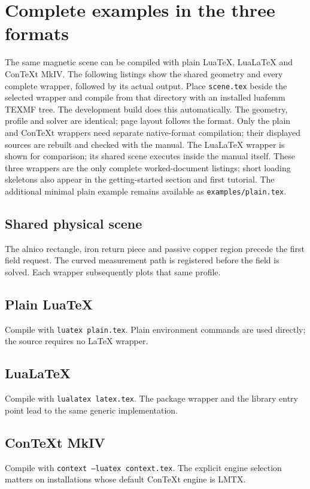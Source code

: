 \section{Complete examples in the three formats}
\label{sec:format-examples}
The same magnetic scene can be compiled with plain LuaTeX, LuaLaTeX and
ConTeXt MkIV. The following listings show the shared geometry and every
complete wrapper, followed by its actual output. Place \texttt{scene.tex}
beside the selected wrapper and compile from that directory with an
installed luafemm TEXMF tree. The development build does this automatically.
The geometry, profile and solver are identical; page layout follows the format.
Only the plain and ConTeXt wrappers need separate native-format compilation;
their displayed sources are rebuilt and checked with the manual. The LuaLaTeX wrapper is shown for comparison; its shared scene executes
inside the manual itself. These three wrappers are the only complete worked-document listings;
short loading skeletons also appear in the getting-started section and first tutorial. The additional minimal plain example remains available as
\nolinkurl{examples/plain.tex}.

\subsection{Shared physical scene}
The alnico rectangle, iron return piece and passive copper region precede
the first field request. The curved measurement path is registered before
the field is solved. Each wrapper subsequently plots that same profile.

\subsection{Plain LuaTeX}
Compile with \texttt{luatex plain.tex}. Plain environment commands are
used directly; the source requires no LaTeX wrapper.

\subsection{LuaLaTeX}
Compile with \texttt{lualatex latex.tex}. The package wrapper and the
library entry point lead to the same generic implementation.
\luafemmlatexexample

\subsection{ConTeXt MkIV}
Compile with \texttt{context --luatex context.tex}. The explicit engine
selection matters on installations whose default ConTeXt engine is LMTX.
